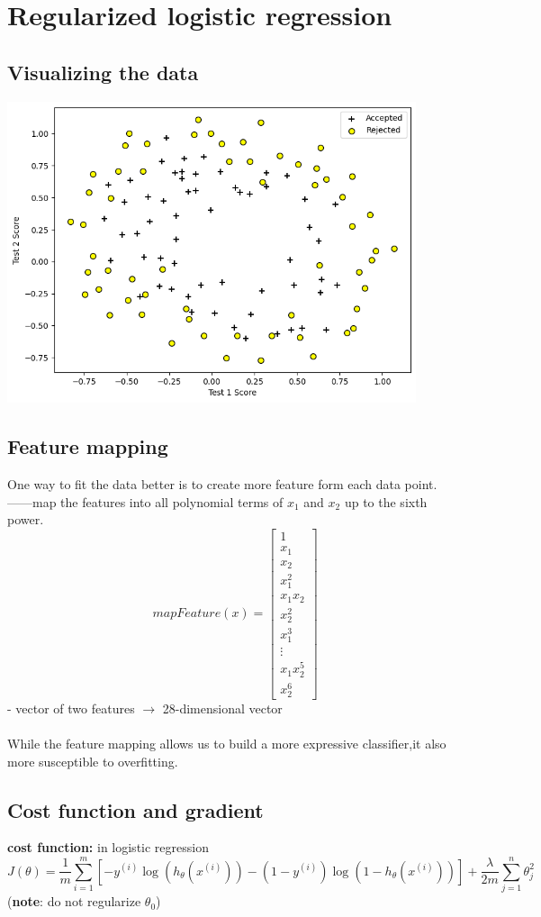 \documentclass[a4paper, 12pt]{book}
\begin{document}
	 \section{Regularized logistic regression}
	 	\subsection{Visualizing the data}
	 \includegraphics[width=12cm]{data22} 
	 	\subsection{Feature mapping}
	 One way to fit the data better is to create more feature form each data point.——map the features into all polynomial terms of \(x_1\) and \(x_2\) up to the sixth power.
	 \[\
	 mapFeature(x) = 
	\begin{bmatrix}
		1 \\ x_1 \\ x_2 \\ x_1^2 \\ x_1x_2 \\ x_2^2 \\ x_1^3 \\ \vdots \\ x_1x_2^5 \\ x_2^6
	\end{bmatrix}
	\]
	- vector of two features \(\rightarrow\) 28-dimensional vector \\ \\
	While the feature mapping allows us to build a more expressive classifier,it also more susceptible to overfitting.
		\subsection{Cost function and gradient}
	\textbf{cost function: } in logistic regression
	\[
		J(\theta)=\frac{1}{m}\sum_{i=1}^{m}[-y^{(i)}\log(h_\theta(x^{(i)}))-(1-y^{(i)})\log(1-h_\theta(x^{(i)}))]+\frac{\lambda}{2m}\sum_{j=1}^{n}\theta_j^2
	\]
	(\textbf{note}: do not regularize \(\theta_0\)) \\
	
\end{document}
